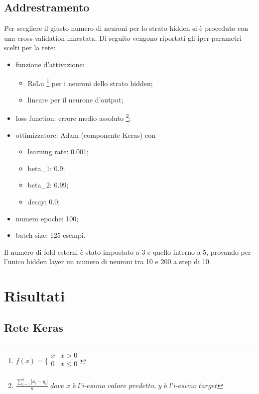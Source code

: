 \documentclass[12pt]{report}
\begin{document}
\subsection{Addrestramento}
Per scegliere il giusto numero di neuroni per lo strato hidden si è proceduto con una cross-validation innestata. Di seguito vengono riportati gli iper-parametri scelti per la rete:
\begin{itemize}
\item{funzione d’attivazione}:

\begin{itemize}
\item{ReLu 
\footnote{$f(x) =
\bigg \{
\begin{array}{rl}
x & x > 0 \\
0 & x \leq 0 \\
\end{array}
$
} per i neuroni dello strato hidden};
\item{lineare per il neurone d'output};
\end{itemize}

\item{loss function}: errore medio assoluto \footnote{
$\displaystyle{\frac{\sum_{i=1}^n \left|x_i - y_i\right|}{n}} \; \textit{dove x è l'i-esimo valore predetto, y è l'i-esimo target}$
};

\item{ottimizzatore}: Adam (componente Keras) con

\begin{itemize}
\item{learning rate}: 0.001;
\item{beta\_1}: 0.9;
\item{beta\_2}: 0.99;
\item{decay}: 0.0;
\end{itemize}

\item{numero epoche}: 100;

\item{batch size}: 125 esempi.
\end{itemize}

Il numero di fold esterni è stato impostato a 3 e quello interno a 5, provando per l'unico hidden layer un numero di neuroni tra 10 e 200 a step di 10.

\section{Risultati}

\subsection{Rete Keras}
\end{document}
